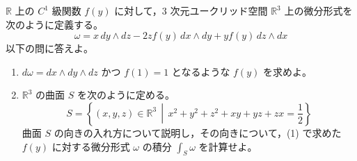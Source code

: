 \documentclass[12pt]{jlreq}
\begin{document}
$\mathbb{R}$ 上の $C^1$ 級関数 $f(y)$ に対して，$3$ 次元ユークリッド空間 $\mathbb{R}^3$ 上の微分形式を次のように定義する。
\[
  \omega = x \, dy \wedge dz - 2zf(y) \, dx \wedge dy + yf(y) \, dz \wedge dx
\]
以下の問に答えよ。

\begin{enumerate}
  \item $d\omega = dx \wedge dy \wedge dz$ かつ $f(1) = 1$ となるような $f(y)$ を求めよ。
  \item $\mathbb{R}^3$ の曲面 $S$ を次のように定める。
  \[
    S = \left\{ (x,y,z) \in \mathbb{R}^3 \,\middle|\, x^2 + y^2 + z^2 + xy + yz + zx = \frac{1}{2} \right\}
  \]
  曲面 $S$ の向きの入れ方について説明し，その向きについて，(1) で求めた $f(y)$ に対する微分形式 $\omega$ の積分 $\int_S \omega$ を計算せよ。
\end{enumerate}
\end{document}
